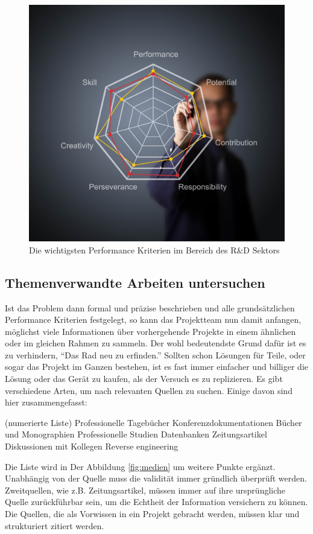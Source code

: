     \begin{figure}[H]
        \centering
        \includegraphics[width=0.5\linewidth]{graphics/kriterien.jpg}
        \caption[Performance Kriterien]{Die wichtigsten Performance Kriterien im Bereich des R\&D Sektors}

        
        \label{fig:kriterien}
    \end{figure}

    \subsection{Themenverwandte Arbeiten untersuchen}

    Ist das Problem dann formal und präzise beschrieben und alle grundsätzlichen Performance 
    Kriterien festgelegt, so kann das Projektteam nun damit anfangen, möglichst viele Informationen 
    über vorhergehende Projekte in einem ähnlichen oder im gleichen Rahmen zu sammeln. Der wohl 
    bedeutendste Grund dafür ist es zu verhindern, “Das Rad neu zu erfinden.” Sollten 
    schon Lösungen für Teile, oder sogar das Projekt im Ganzen bestehen, ist es fast immer 
    einfacher und billiger die Lösung oder das Gerät zu kaufen, als der Versuch es zu replizieren. 
    Es gibt verschiedene Arten, um nach relevanten Quellen zu suchen. Einige davon sind hier 
    zusammengefasst:

        (numerierte Liste)
        Professionelle Tagebücher
        Konferenzdokumentationen
        Bücher und Monographien
        Professionelle Studien 
        Datenbanken
        Zeitungsartikel
        Diskussionen mit Kollegen
        Reverse engineering

    Die Liste wird in Der Abbildung \ref{fig:medien} um weitere Punkte ergänzt.
    Unabhängig von der Quelle muss die validität immer gründlich überprüft werden. 
    Zweitquellen, wie z.B. Zeitungsartikel, müssen immer auf ihre ursprüngliche Quelle 
    zurückführbar sein, um die Echtheit der Information versichern zu können. Die Quellen, die 
    als Vorwissen in ein Projekt gebracht werden, müssen klar und strukturiert zitiert werden.

